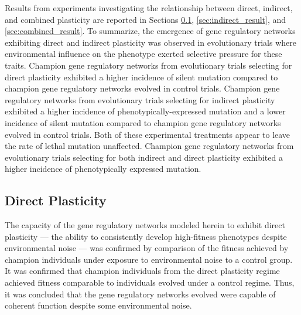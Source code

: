 Results from experiments investigating the relationship between direct, indirect, and combined plasticity are reported in Sections \ref{sec:direct_result}, \ref{sec:indirect_result}, and \ref{sec:combined_result}.
To summarize, the emergence of gene regulatory networks exhibiting direct and indirect plasticity was observed in evolutionary trials where environmental influence on the phenotype exerted selective pressure for these traits.
Champion gene regulatory networks from evolutionary trials selecting for direct plasticity exhibited a higher incidence of silent mutation compared to champion gene regulatory networks evolved in control trials.
Champion gene regulatory networks from evolutionary trials selecting for indirect plasticity exhibited a higher incidence of phenotypically-expressed mutation and a lower incidence of silent mutation compared to champion gene regulatory networks evolved in control trials.
Both of these experimental treatments appear to leave the rate of lethal mutation unaffected.
Champion gene regulatory networks from evolutionary trials selecting for both indirect and direct plasticity exhibited a higher incidence of phenotypically expressed mutation.

\subsection{Direct Plasticity} \label{sec:direct_result}
The capacity of the gene regulatory networks modeled herein to exhibit direct plasticity --- the ability to consistently develop high-fitness phenotypes despite environmental noise --- was confirmed by comparison of the fitness achieved by champion individuals under exposure to environmental noise to a control group.
It was confirmed that champion individuals from the direct plasticity regime achieved fitness comparable to individuals evolved under a control regime.
Thus, it was concluded that the gene regulatory networks evolved were capable of coherent function despite some environmental noise.

